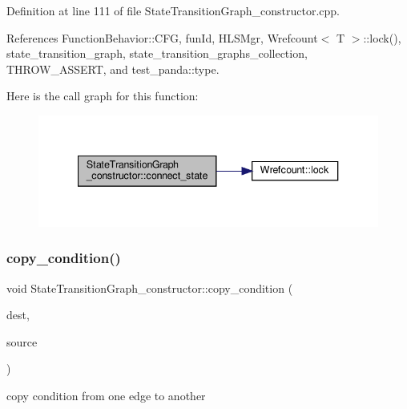 Definition at line 111 of file State\+Transition\+Graph\+\_\+constructor.\+cpp.



References Function\+Behavior\+::\+C\+FG, fun\+Id, H\+L\+S\+Mgr, Wrefcount$<$ T $>$\+::lock(), state\+\_\+transition\+\_\+graph, state\+\_\+transition\+\_\+graphs\+\_\+collection, T\+H\+R\+O\+W\+\_\+\+A\+S\+S\+E\+RT, and test\+\_\+panda\+::type.

Here is the call graph for this function\+:
\nopagebreak
\begin{figure}[H]
\begin{center}
\leavevmode
\includegraphics[width=340pt]{de/dbb/classStateTransitionGraph__constructor_a0a2687d3a0e392539bbcfcc6d7ebf49e_cgraph}
\end{center}
\end{figure}
\mbox{\label{classStateTransitionGraph__constructor_a7c13f3edf3fe5c1a1390fa26a80be2da}} 
\subsubsection{\texorpdfstring{copy\+\_\+condition()}{copy\_condition()}}
{\footnotesize\ttfamily void State\+Transition\+Graph\+\_\+constructor\+::copy\+\_\+condition (\begin{DoxyParamCaption}\item[{const \hyperlink{graph_8hpp_a9eb9afea34e09f484b21f2efd263dd48}{Edge\+Descriptor} \&}]{dest,  }\item[{const \hyperlink{graph_8hpp_a9eb9afea34e09f484b21f2efd263dd48}{Edge\+Descriptor} \&}]{source }\end{DoxyParamCaption})}



copy condition from one edge to another 


